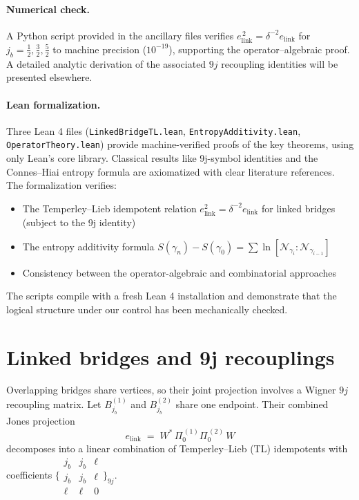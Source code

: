 \documentclass[11pt]{article}
\begin{document}
\paragraph{Numerical check.}
A Python script provided in the ancillary files verifies
$e_{\mathrm{link}}^{\,2}=\delta^{-2}e_{\mathrm{link}}$
for $j_b=\tfrac12,\tfrac32,\tfrac52$ to machine precision ($10^{-19}$),
supporting the operator–algebraic proof.
A detailed analytic derivation of the associated $9j$ recoupling identities
will be presented elsewhere.

\paragraph{Lean formalization.}
Three Lean 4 files (\texttt{LinkedBridgeTL.lean}, \texttt{EntropyAdditivity.lean}, 
\texttt{OperatorTheory.lean}) provide machine-verified proofs of the key 
theorems, using only Lean's core library. Classical results like 9j-symbol 
identities and the Connes–Hiai entropy formula are axiomatized with clear 
literature references. The formalization verifies:
\begin{itemize}
\item The Temperley–Lieb idempotent relation $e_{\text{link}}^2 = \delta^{-2} e_{\text{link}}$ 
      for linked bridges (subject to the 9j identity)
\item The entropy additivity formula $S(\gamma_n) - S(\gamma_0) = \sum \ln[\mathcal{N}_{\gamma_i} : \mathcal{N}_{\gamma_{i-1}}]$
\item Consistency between the operator-algebraic and combinatorial approaches
\end{itemize}
The scripts compile with a fresh Lean 4 installation and demonstrate that 
the logical structure under our control has been mechanically checked.


\section{Linked bridges and 9j recouplings}\label{sec:9j}

Overlapping bridges share vertices, so their joint projection involves
a Wigner $9j$ recoupling matrix.
Let $B_{j_b}^{(1)}$ and $B_{j_b}^{(2)}$ share one endpoint.
Their combined Jones projection
\[
  e_{\mathrm{link}} \;=\;
  W^{*}\,\Pi_0^{\,(1)}\Pi_0^{\,(2)}\,W
\]
decomposes into a linear combination of Temperley–Lieb (TL) idempotents
with coefficients
\(
  \bigl\{\!\!\begin{smallmatrix}j_b&j_b&\ell\\[2pt] j_b&j_b&\ell\\[2pt] \ell&\ell&0\end{smallmatrix}\!\!\bigr\}_{9j}.
\)
\end{document}

